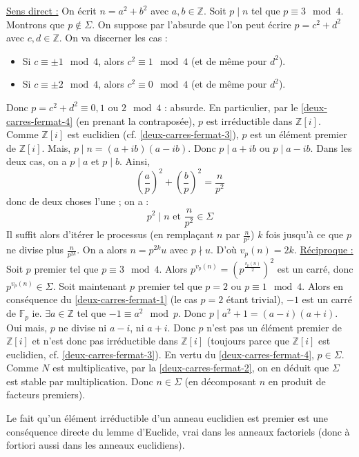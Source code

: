 	\begin{demonstration}
		\underline{Sens direct :} On écrit $n = a^2 + b^2$ avec $a, b \in \mathbb{Z}$. Soit $p \mid n$ tel que $p \equiv 3 \mod 4$. Montrons que $p \notin \Sigma$. On suppose par l'absurde que l'on peut écrire $p = c^2 + d^2$ avec $c, d \in \mathbb{Z}$. On va discerner les cas :
		\begin{itemize}
			\item Si $c \equiv \pm 1 \mod 4$, alors $c^2 \equiv 1 \mod 4$ (et de même pour $d^2$).
			\item Si $c \equiv \pm 2 \mod 4$, alors $c^2 \equiv 0 \mod 4$ (et de même pour $d^2$).
		\end{itemize}
		Donc $p = c^2 + d^2 \equiv 0, 1 \text{ ou } 2 \mod 4$ : absurde. En particulier, par le \cref{deux-carres-fermat-4} (en prenant la contraposée), $p$ est irréductible dans $\mathbb{Z}[i]$. Comme $\mathbb{Z}[i]$ est euclidien (cf. \cref{deux-carres-fermat-3}), $p$ est un élément premier de $\mathbb{Z}[i]$. Mais, $p \mid n = (a+ib)(a-ib)$. Donc $p \mid a+ib$ ou $p \mid a-ib$.
		Dans les deux cas, on a $p \mid a$ et $p \mid b$. Ainsi,
		\[ \left( \frac{a}{p} \right)^2 + \left( \frac{b}{p} \right)^2 = \frac{n}{p^2} \]
		donc de deux choses l'une ; on a :
		\[ p^2 \mid n \text{ et } \frac{n}{p^2} \in \Sigma \]
		Il suffit alors d'itérer le processus (en remplaçant $n$ par $\frac{n}{p^2}$) $k$ fois jusqu'à ce que $p$ ne divise plus $\frac{n}{p^{2k}}$. On a alors $n = p^{2k} u$ avec $p \nmid u$. D'où $v_p(n) = 2k$.
		\newpar
		\underline{Réciproque :} Soit $p$ premier tel que $p \equiv 3 \mod 4$. Alors $p^{v_p(n)} = \left( p^{\frac{v_p(n)}{2}} \right)^2$ est un carré, donc $p^{v_p(n)} \in \Sigma$.
		\newpar
		Soit maintenant $p$ premier tel que $p = 2$ ou $p \equiv 1  \mod 4$. Alors en conséquence du \cref{deux-carres-fermat-1} (le cas $p = 2$ étant trivial), $-1$ est un carré de $\mathbb{F}_p$ ie. $\exists a \in \mathbb{Z}$ tel que $-1 \equiv a^2 \mod p$. Donc $p \mid a^2 + 1 = (a-i)(a+i)$. Oui mais, $p$ ne divise ni $a-i$, ni $a+i$. Donc $p$ n'est pas un élément premier de $\mathbb{Z}[i]$ et n'est donc pas irréductible dans $\mathbb{Z}[i]$ (toujours parce que $\mathbb{Z}[i]$ est euclidien, cf. \cref{deux-carres-fermat-3}). En vertu du \cref{deux-carres-fermat-4}, $p \in \Sigma$.
		\newpar
		Comme $N$ est multiplicative, par la \cref{deux-carres-fermat-2}, on en déduit que $\Sigma$ est stable par multiplication. Donc $n \in \Sigma$ (en décomposant $n$ en produit de facteurs premiers).
	\end{demonstration}


	\begin{remark}
		Le fait qu'un élément irréductible d'un anneau euclidien est premier est une conséquence directe du lemme d'Euclide, vrai dans les anneaux factoriels (donc à fortiori aussi dans les anneaux euclidiens).
	\end{remark}

